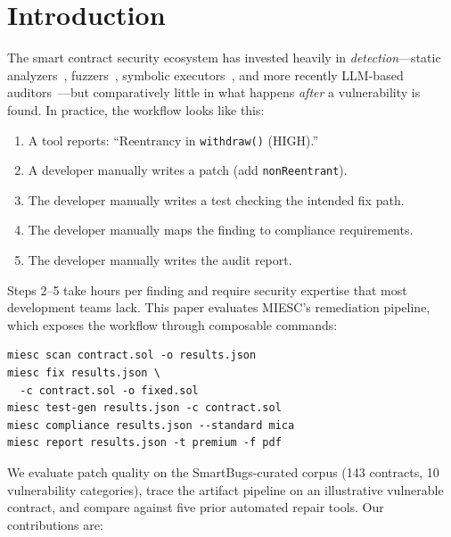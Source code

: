 \documentclass[conference]{IEEEtran}
\begin{document}
\section{Introduction}

The smart contract security ecosystem has invested heavily in \emph{detection}---static analyzers~\cite{feist2019slither}, fuzzers~\cite{grieco2020echidna}, symbolic executors~\cite{mueller2018smashing}, and more recently LLM-based auditors~\cite{sun2024gptscan}---but comparatively little in what happens \emph{after} a vulnerability is found. In practice, the workflow looks like this:

\begin{enumerate}
    \item A tool reports: ``Reentrancy in \texttt{withdraw()} (HIGH).''
    \item A developer manually writes a patch (add \texttt{nonReentrant}).
    \item The developer manually writes a test checking the intended fix path.
    \item The developer manually maps the finding to compliance requirements.
    \item The developer manually writes the audit report.
\end{enumerate}

Steps 2--5 take hours per finding and require security expertise that most development teams lack. This paper evaluates MIESC's remediation pipeline, which exposes the workflow through composable commands:

\begin{verbatim}
miesc scan contract.sol -o results.json
miesc fix results.json \
  -c contract.sol -o fixed.sol
miesc test-gen results.json -c contract.sol
miesc compliance results.json --standard mica
miesc report results.json -t premium -f pdf
\end{verbatim}

We evaluate patch quality on the SmartBugs-curated corpus (143 contracts, 10 vulnerability categories), trace the artifact pipeline on an illustrative vulnerable contract, and compare against five prior automated repair tools. Our contributions are:
\end{document}
